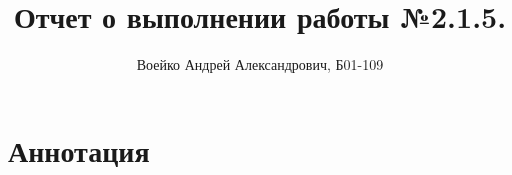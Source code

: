 \documentclass[a4paper,11pt]{book}
\title{Отчет о выполнении работы №2.1.5.}
\author{Воейко Андрей Александрович, Б01-109}
\begin{document}
\maketitle
\newpage
\section{Аннотация}
\end{document}
